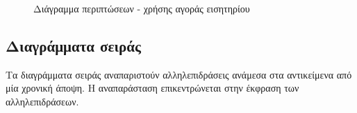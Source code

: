 \documentclass{assignment}
\begin{document}
\begin{figure}
\begin{center}
\caption{Διάγραμμα περιπτώσεων - χρήσης αγοράς εισητηρίου}
\label{fig:use_case_ticket}
\end{center}
\end{figure}

\subsection{Διαγράμματα σειράς}

Τα διαγράμματα σειράς αναπαριστούν αλληλεπιδράσεις ανάμεσα στα αντικείμενα από μία χρονική άποψη. Η αναπαράσταση επικεντρώνεται στην έκφραση των αλληλεπιδράσεων. 
\end{document}
